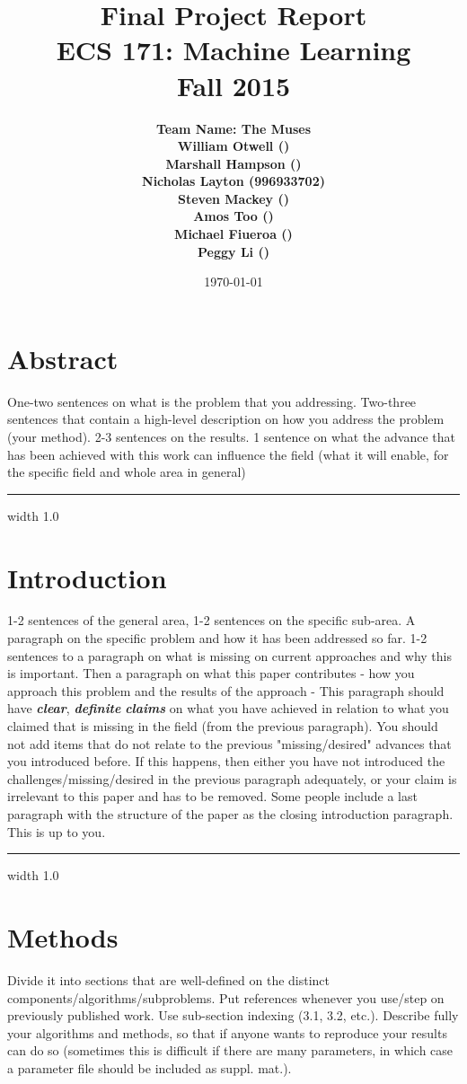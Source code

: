 \documentclass[12pt]{article}
\title{\vspace{-3ex}\bf Final Project Report\\[2ex] 
       \normalsize ECS 171: Machine Learning\\Fall 2015}
\date{\today}
\author{\bf Team Name: The Muses\\ \bf William Otwell ()\\ \bf Marshall Hampson ()\\ \bf Nicholas Layton (996933702)\\ \bf Steven Mackey ()\\ \bf Amos Too ()\\ \bf Michael Fiueroa ()\\ \bf Peggy Li ()}
\newcommand{\horizontalLine}{
	\begin{center}
		\hrule width 1.0\textwidth
	\end{center}
}
\begin{document}
\maketitle
\pagebreak
\tableofcontents
\pagebreak

\section{Abstract}
\label{sec:abstract}
One-two sentences on what is the problem that you addressing. Two-three sentences
that contain a high-level description on how you address the problem (your method). 2-3 sentences
on the results. 1 sentence on what the advance that has been achieved with this work
can influence the field (what it will enable, for the specific field and whole area in general)

\horizontalLine
\section{Introduction}
\label{sec:introduction}
1-2 sentences of the general area, 1-2 sentences on the specific sub-area. A paragraph
on the specific problem and how it has been addressed so far. 1-2 sentences to a paragraph
on what is missing on current approaches and why this is important.
Then a paragraph on what this paper contributes - how you approach this problem and the
results of the approach - This paragraph should have \textbf{\textit{clear}}, \textbf{\textit{definite}} \textbf{\textit{claims}} on what you have
achieved in relation to what you claimed that is missing in the field (from the previous paragraph).
You should not add items that do not relate to the previous "missing/desired" advances
that you introduced before. If this happens, then either you have not introduced the challenges/missing/desired
in the previous paragraph adequately, or your claim is irrelevant to this
paper and has to be removed.
Some people include a last paragraph with the structure of the paper as the closing introduction
paragraph. This is up to you.

\horizontalLine
\section{Methods}
\label{sec:methods}
 Divide it into sections that are well-defined on the distinct components/algorithms/subproblems.
 Put references whenever you use/step on previously published work. Use sub-section
 indexing (3.1, 3.2, etc.). Describe fully your algorithms and methods, so that if anyone wants to
 reproduce your results can do so (sometimes this is difficult if there are many parameters, in
 which case a parameter file should be included as suppl. mat.).
\end{document}
